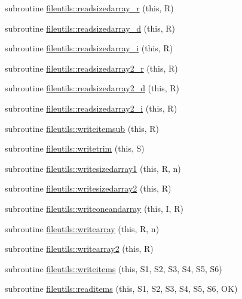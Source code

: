 \begin{DoxyCompactItemize}
\item 
subroutine \mbox{\hyperlink{namespacefileutils_a9d5d97346bddaa16024b5482cc1ce7cb}{fileutils\+::readsizedarray\+\_\+r}} (this, R)
\item 
subroutine \mbox{\hyperlink{namespacefileutils_ab663b9fbd43f12bd0ad8fdda4c1ff85e}{fileutils\+::readsizedarray\+\_\+d}} (this, R)
\item 
subroutine \mbox{\hyperlink{namespacefileutils_a767a096f95f5ccbb1c02deb7d926032b}{fileutils\+::readsizedarray\+\_\+i}} (this, R)
\item 
subroutine \mbox{\hyperlink{namespacefileutils_a7fd8e6d80f0ccadb1d773d86d8871816}{fileutils\+::readsizedarray2\+\_\+r}} (this, R)
\item 
subroutine \mbox{\hyperlink{namespacefileutils_a0057e2b91f8c173074b68aadbe1d3e92}{fileutils\+::readsizedarray2\+\_\+d}} (this, R)
\item 
subroutine \mbox{\hyperlink{namespacefileutils_acd15bd801738b538b71b3216aaab95cc}{fileutils\+::readsizedarray2\+\_\+i}} (this, R)
\item 
subroutine \mbox{\hyperlink{namespacefileutils_a57cd0a2cbc7978f19baaebb111cdbe1d}{fileutils\+::writeitemsub}} (this, R)
\item 
subroutine \mbox{\hyperlink{namespacefileutils_afe12625f20868804aae9ff245b783baf}{fileutils\+::writetrim}} (this, S)
\item 
subroutine \mbox{\hyperlink{namespacefileutils_a416e6d6a5f7a1dfc3da764788ecaac59}{fileutils\+::writesizedarray1}} (this, R, n)
\item 
subroutine \mbox{\hyperlink{namespacefileutils_aae72a2f6c28cf65ba7b21cd90f399eeb}{fileutils\+::writesizedarray2}} (this, R)
\item 
subroutine \mbox{\hyperlink{namespacefileutils_adf43b426efd6b01f81b673d3db3cd8d8}{fileutils\+::writeoneandarray}} (this, I, R)
\item 
subroutine \mbox{\hyperlink{namespacefileutils_af7dad8ef48af586cc127b552cadeb999}{fileutils\+::writearray}} (this, R, n)
\item 
subroutine \mbox{\hyperlink{namespacefileutils_aa3569bb8cce3d65a6a7e820571bba597}{fileutils\+::writearray2}} (this, R)
\item 
subroutine \mbox{\hyperlink{namespacefileutils_a0a2890041ec846715c0990fc468b6be1}{fileutils\+::writeitems}} (this, S1, S2, S3, S4, S5, S6)
\item 
subroutine \mbox{\hyperlink{namespacefileutils_add4cb070c36870fe26122c8b1802894b}{fileutils\+::readitems}} (this, S1, S2, S3, S4, S5, S6, OK)

\end{DoxyCompactItemize}
